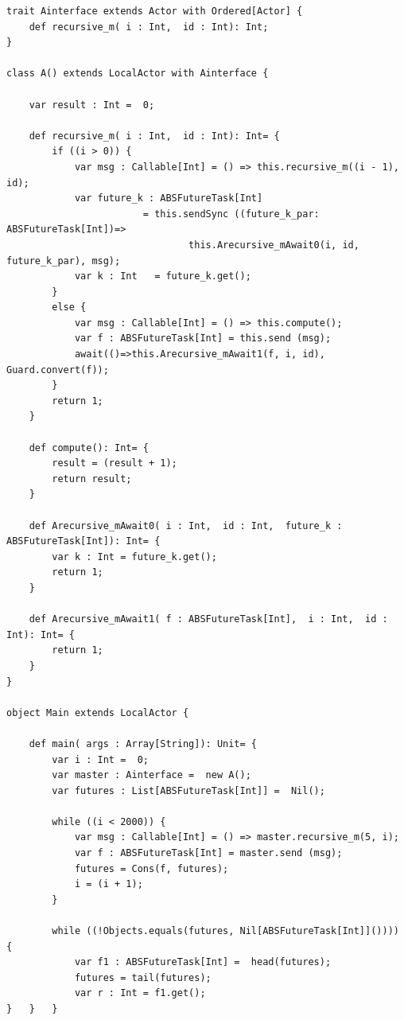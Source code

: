 \begin{lstlisting}[caption= Benchmark Example, label=scalaex]
trait Ainterface extends Actor with Ordered[Actor] {
	def recursive_m( i : Int,  id : Int): Int;
}

class A() extends LocalActor with Ainterface {

	var result : Int =  0;
	
	def recursive_m( i : Int,  id : Int): Int= {
		if ((i > 0)) {
			var msg : Callable[Int] = () => this.recursive_m((i - 1), id);
			var future_k : ABSFutureTask[Int]  
						= this.sendSync ((future_k_par: ABSFutureTask[Int])=>
								this.Arecursive_mAwait0(i, id, future_k_par), msg);
			var k : Int   = future_k.get();
		}
		else {
			var msg : Callable[Int] = () => this.compute();
			var f : ABSFutureTask[Int] = this.send (msg);
			await(()=>this.Arecursive_mAwait1(f, i, id), Guard.convert(f));
		}
		return 1;
	}
	
	def compute(): Int= {
		result = (result + 1);
		return result;
	}
	
	def Arecursive_mAwait0( i : Int,  id : Int,  future_k : ABSFutureTask[Int]): Int= {
		var k : Int = future_k.get();
		return 1;
	}
	
	def Arecursive_mAwait1( f : ABSFutureTask[Int],  i : Int,  id : Int): Int= {
		return 1;
	}
}

object Main extends LocalActor {

	def main( args : Array[String]): Unit= {
		var i : Int =  0;
		var master : Ainterface =  new A();
		var futures : List[ABSFutureTask[Int]] =  Nil();
		
		while ((i < 2000)) {
			var msg : Callable[Int] = () => master.recursive_m(5, i);
			var f : ABSFutureTask[Int] = master.send (msg);
			futures = Cons(f, futures);
			i = (i + 1);
		}
		
		while ((!Objects.equals(futures, Nil[ABSFutureTask[Int]]()))) {
			var f1 : ABSFutureTask[Int] =  head(futures);
			futures = tail(futures);
			var r : Int = f1.get();
}	}	}
\end{lstlisting}

